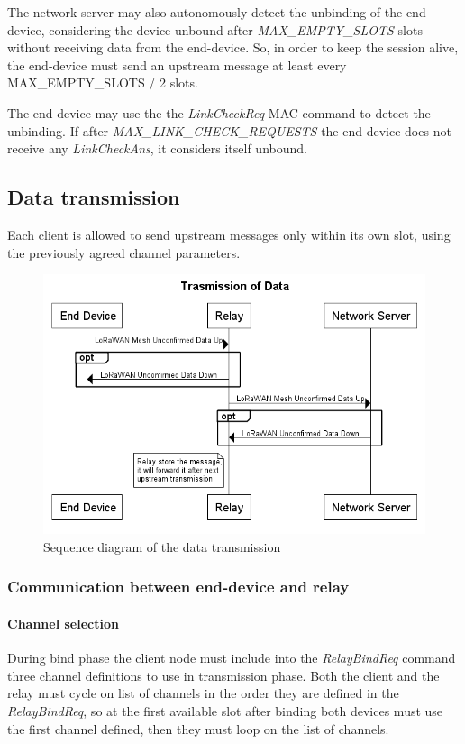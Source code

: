 The network server may also autonomously detect the unbinding of the end-device, considering the device unbound after \emph{MAX\_EMPTY\_SLOTS} slots without receiving data from the end-device. So, in order to keep the session alive, the end-device must send an upstream message at least every MAX\_EMPTY\_SLOTS / 2 slots.

The end-device may use the the \emph{LinkCheckReq} MAC command to detect the unbinding. If after \emph{MAX\_LINK\_CHECK\_REQUESTS} the end-device does not receive any \emph{LinkCheckAns}, it considers itself unbound.




\subsection{Data transmission}
Each client is allowed to send upstream messages only within its own slot, using the previously agreed channel parameters.

\begin{figure}[]
\centering
\includegraphics[width=\textwidth]{img/seqdia/datatx}
\caption{Sequence diagram of the data transmission}
\label{fig:datatx}
\end{figure}



\subsubsection{Communication between end-device and relay}
\paragraph{Channel selection}
During bind phase the client node must include into the \emph{RelayBindReq} command three channel definitions to use in transmission phase. Both the client and the relay must cycle on list of channels in the order they are defined in the \emph{RelayBindReq}, so at the first available slot after binding both devices must use the first channel defined, then they must loop on the list of channels. 

